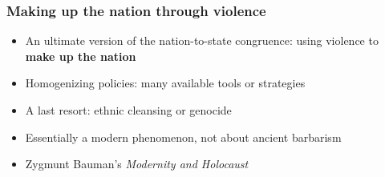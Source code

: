 \documentclass[aspectratio=43]{beamer}
\begin{document}
\begin{frame}
\frametitle{Making up the nation through violence}
\centering

\begin{itemize}
  \item An ultimate version of the nation-to-state congruence: using violence to \textbf{make up the nation}
  \item Homogenizing policies: many available tools or strategies
  \item A last resort: ethnic cleansing or genocide
  \item Essentially a modern phenomenon, not about ancient barbarism
  \item Zygmunt Bauman's \textit{Modernity and Holocaust}
\end{itemize}

\end{frame}
\end{document}

